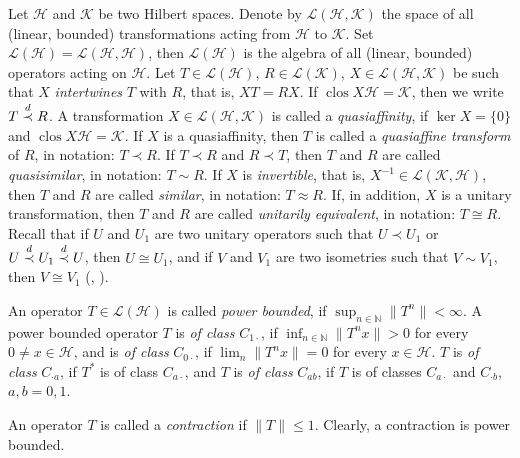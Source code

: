 \documentclass[a4paper,oneside,11pt]{amsart}
\numberwithin{equation}{section}
\theoremstyle{plain}
\theoremstyle{definition}
\begin{document}
Let $\mathcal H$  and $\mathcal K$ be two Hilbert spaces. Denote by $\mathcal L(\mathcal H, \mathcal K)$ 
the space of all  (linear, bounded) transformations acting from $\mathcal H$ to  $\mathcal K$. 
Set $\mathcal L(\mathcal H)=\mathcal L(\mathcal H, \mathcal H)$, then $\mathcal L(\mathcal H)$ is 
 the algebra of all (linear, bounded) operators acting on $\mathcal H$. 
Let $T\in\mathcal L(\mathcal H)$,
$R\in\mathcal L(\mathcal K)$, $X\in\mathcal L(\mathcal H, \mathcal K)$ be such that $X$ \emph{intertwines} $T$ with $R$, that is, $XT=RX$. 
If $\operatorname{clos}X\mathcal H=\mathcal K$, then we write $T\buildrel d \over\prec R$. A transformation 
 $X\in\mathcal L(\mathcal H, \mathcal K)$ is called a \emph{quasiaffinity}, if $\ker X=\{0\}$ and 
$\operatorname{clos}X\mathcal H=\mathcal K$. 
If $X$ is a quasiaffinity, then $T$ is called a \emph{quasiaffine transform} of $R$, in notation: $T\prec R$. 
If $T\prec R$ and $R\prec T$, then $T$ and $R$ are called \emph{quasisimilar}, in notation: $T\sim R$. 
If $X$ is \emph{invertible}, that is, 
$X^{-1}\in\mathcal L(\mathcal K, \mathcal H)$, then $T$ and $R$ are called \emph{similar}, in notation: $T\approx R$.  If, in addition, 
$X$ is a unitary transformation, then $T$ and $R$ are called \emph{unitarily equivalent}, in notation: $T\cong R$. 
Recall that if $U$ and $U_1$ are two unitary operators such that $U\prec U_1$ or 
$U\buildrel d \over\prec U_1\buildrel d \over\prec U$,  then $U\cong U_1$, 
and if $V$ and $V_1$ are two isometries such that $V\sim V_1$, then $V\cong V_1$ ({\cite[Proposition II.3.4]{nfbk}}, 
{\cite[Lemma II.13.6, Propositions II.10.6 and II.13.7]{conway}}).

An operator  $T\in\mathcal L(\mathcal H)$ is called \emph{power bounded}, if $\sup_{n\in\mathbb N}\|T^n\|<\infty$.
 A power bounded operator $T$ is 
\emph{of class} $C_{1\cdot}$, if $\inf_{n\in\mathbb N}\|T^n x\|>0$ for every $0\neq x\in\mathcal H$, 
and is \emph{of class} $C_{0\cdot}$, if $\lim_n\|T^n x\|=0$ for every $ x\in\mathcal H$. 
$T$ is \emph{of class} $C_{\cdot a}$, if $T^*$ is of class $C_{a\cdot}$, and $T$ is \emph{of class} $C_{ab}$, 
if $T$ is of classes $C_{a\cdot}$ and $C_{\cdot b}$, $a,b=0,1$.
 
An operator $T$ is called a {\it contraction} if $\|T\|\leq 1$. Clearly, a contraction is power bounded. 
\end{document}
